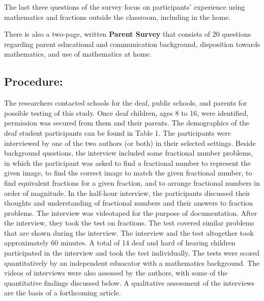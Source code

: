 \documentclass[11.5pt]{sig-alternate} %
\begin{document}
\begin{large}
The last three questions of the survey focus on participants’ experience using mathematics and fractions outside the classroom, including in the home.

There is also a two-page, written \textbf{Parent Survey} that consists of 20 questions regarding parent educational and communication background, disposition towards mathematics, and use of mathematics at home.

\subsection*{Procedure:}

The researchers contacted schools for the deaf, public schools, and parents for possible testing of this study. Once deaf children, ages 8 to 16, were identified, permission was secured from them and their parents. The demographics of the deaf student participants can be found in Table 1. The participants were interviewed by one of the two authors (or both) in their selected settings. Beside background questions, the interview included some fractional number problems, in which the participant was asked to find a fractional number to represent the given image, to find the correct image to match the given fractional number, to find equivalent fractions for a given fraction, and to arrange fractional numbers in order of magnitude. In the half-hour interview, the participants discussed their thoughts and understanding of fractional numbers and their answers to fraction problems. The interview was videotaped for the purpose of documentation. After the interview, they took the test on fractions. The test covered similar problems that are shown during the interview. The interview and the test altogether took approximately 60 minutes. A total of 14 deaf and hard of hearing children participated in the interview and took the test individually. The tests were scored quantitatively by an independent eduacator with a mathematics background. The videos of interviews were also assessed by the authors, with some of the quantitative findings discussed below. A qualitative assessment of the interviews are the basis of a forthcoming article.


\end{large}
\end{document}
